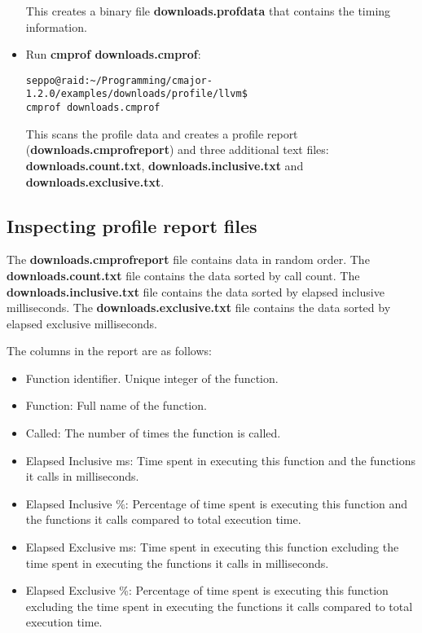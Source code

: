\documentclass[oneside, a4paper, 11pt]{article}
\begin{document}
\begin{itemize}
This creates a binary file \textbf{downloads.profdata} that contains the
timing information.

\item
Run \textbf{cmprof downloads.cmprof}:
\begin{verbatim}
seppo@raid:~/Programming/cmajor-1.2.0/examples/downloads/profile/llvm$
cmprof downloads.cmprof
\end{verbatim}

This scans the profile data and creates a  profile report (\textbf{downloads.cmprofreport}) and
three additional text files:
\textbf{downloads.count.txt}, \textbf{downloads.inclusive.txt} and \textbf{downloads.exclusive.txt}.

\end{itemize}

\subsection{Inspecting profile report files}

The \textbf{downloads.cmprofreport} file contains data in random order.
The \textbf{downloads.count.txt} file contains the data sorted by call count.
The \textbf{downloads.inclusive.txt} file contains the data sorted by elapsed inclusive milliseconds.
The \textbf{downloads.exclusive.txt} file contains the data sorted by elapsed exclusive milliseconds.

The columns in the report are as follows:

\begin{itemize}

\item Function identifier.
Unique integer of the function.

\item Function:
Full name of the function.

\item Called:
The number of times the function is called.

\item Elapsed Inclusive ms:
Time spent in executing this function and the functions it calls in milliseconds.

\item Elapsed Inclusive \%:
Percentage of time spent is executing this function and the functions it calls
compared to total execution time.

\item Elapsed Exclusive ms:
Time spent in executing this function excluding the time spent in executing
the functions it calls in milliseconds.

\item Elapsed Exclusive \%:
Percentage of time spent is executing this function excluding the time spent in executing
the functions it calls compared to total execution time.

\end{itemize}
\end{document}
